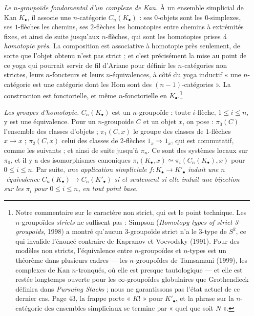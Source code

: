 \documentclass[11pt,a4paper]{article}
\begin{document}
\emph{Le $n$-groupoïde fondamental d'un complexe de Kan.} À un ensemble
simplicial de Kan $K_\bullet$, il associe une $n$-catégorie
$C_n(K_\bullet)$ : ses $0$-objets sont les $0$-simplexes, ses $1$-flèches les
chemins, ses $2$-flèches les homotopies entre chemins à extrémités fixes, et
ainsi de suite jusqu'aux $n$-flèches, qui sont les homotopies prises
\emph{à homotopie près}. La composition est associative à homotopie près
seulement, de sorte que l'objet obtenu n'est pas strict ; et c'est
précisément la mise au point de ce yoga qui pourrait servir de fil d'Ariane
pour définir les $n$-catégories non strictes, leurs $n$-foncteurs et leurs
$n$-équivalences, à côté du yoga inductif « une $n$-catégorie est une
catégorie dont les $\mathrm{Hom}$ sont des $(n-1)$-catégories ». La
construction est fonctorielle, et même $n$-fonctorielle en $K_\bullet$.\footnote{Notre commentaire sur le caractère non strict, qui est le point
technique. Les $n$-groupoïdes \emph{stricts} ne suffisent pas : Simpson
(\emph{Homotopy types of strict 3-groupoids}, 1998) a montré qu'aucun
$3$-groupoïde strict n'a le $3$-type de $S^2$, ce qui invalide l'énoncé
contraire de Kapranov et Voevodsky (1991). Pour des modèles non stricts,
l'équivalence entre $n$-groupoïdes et $n$-types est un théorème dans
plusieurs cadres --- les $n$-groupoïdes de Tamsamani (1999), les complexes
de Kan $n$-tronqués, où elle est presque tautologique --- et elle est
restée longtemps ouverte pour les $\infty$-groupoïdes globulaires que
Grothendieck définira dans \emph{Pursuing Stacks} ; nous ne garantissons
pas l'état actuel de ce dernier cas. Page 43, la frappe porte « $K!$ » pour
$K'_\bullet$, et la phrase sur la $n$-catégorie des ensembles simpliciaux
se termine par « quel que soit $N$ ».}

\emph{Les groupes d'homotopie.} $C_n(K_\bullet)$ est un $n$-groupoïde : toute
$i$-flèche, $1 \leqslant i \leqslant n$, y est une équivalence. Pour un
$n$-groupoïde $C$ et un objet $x$, on pose : $\pi_0(C)$ l'ensemble des
classes d'objets ; $\pi_1(C,x)$ le groupe des classes de $1$-flèches
$x \to x$ ; $\pi_2(C,x)$ celui des classes de $2$-flèches
$1_x \Rightarrow 1_x$, qui est commutatif, comme les suivants ; et ainsi de
suite jusqu'à $\pi_n$. Ce sont des systèmes locaux sur $\pi_0$, et il y a
des isomorphismes canoniques $\pi_i(K_\bullet,x) \simeq \pi_i(C_n(K_\bullet),x)$
pour $0 \leqslant i \leqslant n$. Par suite, \emph{une application
simpliciale $f : K_\bullet \to K'_\bullet$ induit une $n$-équivalence
$C_n(K_\bullet) \to C_n(K'_\bullet)$ si et seulement si elle induit une
bijection sur les $\pi_i$ pour $0 \leqslant i \leqslant n$, en tout point
base.}
\end{document}
